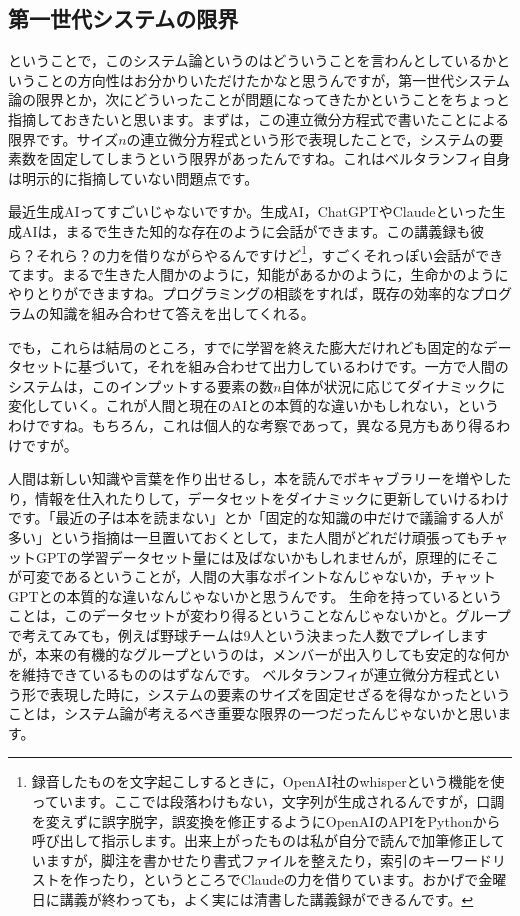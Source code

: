 \documentclass{ltjsbook}
\begin{document}
\subsection{第一世代システムの限界}

ということで，このシステム論というのはどういうことを言わんとしているかということの方向性はお分かりいただけたかなと思うんですが，第一世代システム論の限界とか，次にどういったことが問題になってきたかということをちょっと指摘しておきたいと思います。まずは，この連立微分方程式で書いたことによる限界です。サイズ$n$の連立微分方程式という形で表現したことで，システムの要素数を固定してしまうという限界があったんですね。これはベルタランフィ自身は明示的に指摘していない問題点です。


最近生成AIってすごいじゃないですか。生成AI，ChatGPTやClaudeといった生成AIは，まるで生きた知的な存在のように会話ができます。この講義録も彼ら？それら？の力を借りながらやるんですけど\footnote{録音したものを文字起こしするときに，OpenAI社のwhisperという機能を使っています。ここでは段落わけもない，文字列が生成されるんですが，口調を変えずに誤字脱字，誤変換を修正するようにOpenAIのAPIをPythonから呼び出して指示します。出来上がったものは私が自分で読んで加筆修正していますが，脚注を書かせたり書式ファイルを整えたり，索引のキーワードリストを作ったり，というところでClaudeの力を借りています。おかげで金曜日に講義が終わっても，よく実には清書した講義録ができるんです。}，すごくそれっぽい会話ができてます。まるで生きた人間かのように，知能があるかのように，生命かのようにやりとりができますね。プログラミングの相談をすれば，既存の効率的なプログラムの知識を組み合わせて答えを出してくれる。

でも，これらは結局のところ，すでに学習を終えた膨大だけれども固定的なデータセットに基づいて，それを組み合わせて出力しているわけです。一方で人間のシステムは，このインプットする要素の数$n$自体が状況に応じてダイナミックに変化していく。これが人間と現在のAIとの本質的な違いかもしれない，というわけですね。もちろん，これは個人的な考察であって，異なる見方もあり得るわけですが。

人間は新しい知識や言葉を作り出せるし，本を読んでボキャブラリーを増やしたり，情報を仕入れたりして，データセットをダイナミックに更新していけるわけです。「最近の子は本を読まない」とか「固定的な知識の中だけで議論する人が多い」という指摘は一旦置いておくとして，また人間がどれだけ頑張ってもチャットGPTの学習データセット量には及ばないかもしれませんが，原理的にそこが可変であるということが，人間の大事なポイントなんじゃないか，チャットGPTとの本質的な違いなんじゃないかと思うんです。
生命を持っているということは，このデータセットが変わり得るということなんじゃないかと。グループで考えてみても，例えば野球チームは9人という決まった人数でプレイしますが，本来の有機的なグループというのは，メンバーが出入りしても安定的な何かを維持できているもののはずなんです。
ベルタランフィが連立微分方程式という形で表現した時に，システムの要素のサイズを固定せざるを得なかったということは，システム論が考えるべき重要な限界の一つだったんじゃないかと思います。
\end{document}
